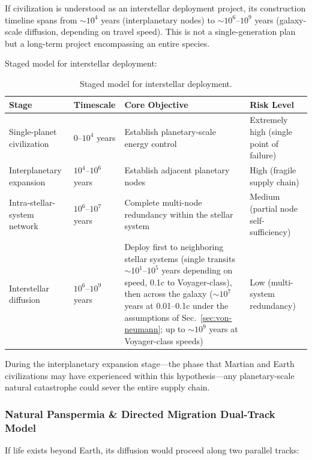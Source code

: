 \documentclass[aps,prd,twocolumn,superscriptaddress,nofootinbib]{revtex4-2}
\begin{document}
If civilization is understood as an interstellar deployment project, its construction timeline spans from ${\sim}10^{4}$ years (interplanetary nodes) to ${\sim}10^{6}$--$10^{9}$ years (galaxy-scale diffusion, depending on travel speed). This is not a single-generation plan but a long-term project encompassing an entire species.

Staged model for interstellar deployment:

\begin{table}[htbp]
\caption{Staged model for interstellar deployment.}
\label{tab:deployment-stages}
\footnotesize
\begin{tabular}{P{0.176\textwidth}P{0.144\textwidth}P{0.345\textwidth}P{0.206\textwidth}}
\toprule
Stage & Timescale & Core Objective & Risk Level \\
\midrule
Single-planet civilization & 0--$10^{4}$ years & Establish planetary-scale energy control & Extremely high (single point of failure) \\
Interplanetary expansion & $10^{4}$--$10^{6}$ years & Establish adjacent planetary nodes & High (fragile supply chain) \\
Intra-stellar-system network & $10^{6}$--$10^{7}$ years & Complete multi-node redundancy within the stellar system & Medium (partial node self-sufficiency) \\
Interstellar diffusion & $10^{6}$--$10^{9}$ years & Deploy first to neighboring stellar systems (single transits ${\sim}10^{1}$--$10^{5}$ years depending on speed, 0.1c to Voyager-class), then across the galaxy (${\sim}10^{7}$ years at 0.01--0.1c under the assumptions of Sec.~\ref{sec:von-neumann}; up to ${\sim}10^{9}$ years at Voyager-class speeds) & Low (multi-system redundancy) \\
\bottomrule
\end{tabular}
\end{table}

During the interplanetary expansion stage---the phase that Martian and Earth civilizations may have experienced within this hypothesis---any planetary-scale natural catastrophe could sever the entire supply chain.

\subsubsection{Natural Panspermia \& Directed Migration Dual-Track Model}\label{sec:dual-track}

If life exists beyond Earth, its diffusion would proceed along two parallel tracks:
\end{document}
